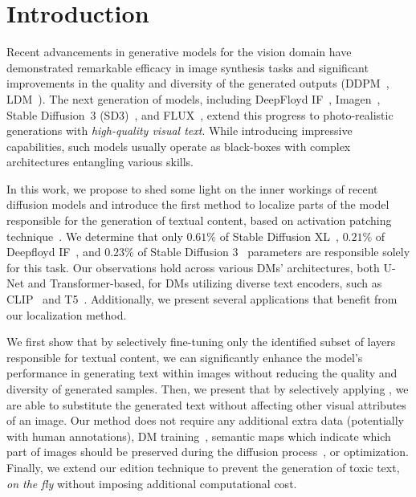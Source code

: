 \section{Introduction}


Recent advancements in generative models for the vision domain have demonstrated remarkable efficacy in image synthesis tasks and significant improvements in the quality and diversity of the generated outputs (DDPM~\citep{ho2020}, LDM~\citep{rombach2022high}). The next generation of models, including DeepFloyd IF~\citep{DeepFloydIF}, Imagen~\citep{saharia2022imagen}, Stable Diffusion~3 (SD3)~\citep{esser2024scalingSD3}, and FLUX~\citep{flux}, extend this progress to photo-realistic generations with \textit{high-quality visual text}. While introducing impressive capabilities, such models usually operate as black-boxes with complex architectures entangling various skills.

In this work, we propose to shed some light on the inner workings of recent diffusion models and introduce the first method to localize parts of the model responsible for the generation of textual content, based on activation patching technique~\citep{meng2022locatingPatching}.
We determine that only $0.61\%$ of Stable Diffusion XL~\citep{podell2023sdxl}, $0.21\%$ of Deepfloyd IF~\citep{DeepFloydIF}, and $0.23\%$ of Stable Diffusion 3~\citep{esser2024scalingSD3} parameters are responsible solely for this task. Our observations hold across various DMs' architectures, both U-Net and Transformer-based, for DMs utilizing diverse text encoders, such as CLIP~\citep{clip} and T5~\citep{raffel2020exploringT5,roberts2022t5x}.
Additionally, we present several applications that benefit from our %
localization method.

We first show that by selectively fine-tuning only the identified subset of layers responsible for textual content, we can significantly enhance the model’s performance in generating text within images without reducing the quality and diversity of generated samples.
Then, we present that by selectively applying \patching, we are able to substitute the generated text without affecting other visual attributes of an image. Our method does not require any additional extra data (potentially with human annotations), DM training~\citep{brooks2023instructPix2Pix}, semantic maps which indicate which part of images should be preserved during the diffusion process~\citep{andonian2021paintByWord,tuo2024anytext}, or optimization.
Finally, we extend our edition technique to prevent the generation of toxic text, \emph{on the fly} without imposing additional computational cost.




